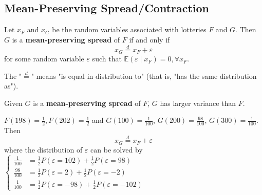 \documentclass[11pt]{elegantbook}
\begin{document}
\subsection{Mean-Preserving Spread/Contraction}
\begin{definition}
    \normalfont
    Let $x_F$ and $x_G$ be the random variables associated with lotteries $F$ and $G$. Then $G$ is a \textbf{mean-preserving spread} of $F$ if and only if $$x_G \stackrel{d}{=} x_F+\varepsilon$$
    for some random variable $\varepsilon$ such that $\mathbb{E}(\varepsilon\mid x_F)=0,\forall x_F$.
\end{definition}
The "$\stackrel{d}{=}$" means "is equal in distribution to" (that is, "has the same distribution as").

\begin{note}
    Given $G$ is a \textbf{mean-preserving spread} of $F$, $G$ has larger variance than $F$.
\end{note}

\begin{example}
    $F(198)=\frac{1}{2}, F(202)=\frac{1}{2}$ and $G(100)=\frac{1}{100}$, $G(200)=\frac{98}{100}$, $G(300)=\frac{1}{100}$. Then $$x_G \stackrel{d}{=} x_F+\varepsilon$$
    where the distribution of $\varepsilon$ can be solved by $\left\{\begin{matrix}
        \frac{1}{100}&=\frac{1}{2}P(\varepsilon=102)+\frac{1}{2}P(\varepsilon=98)\\
        \frac{98}{100}&=\frac{1}{2}P(\varepsilon=2)+\frac{1}{2}P(\varepsilon=-2)\\
        \frac{1}{100}&=\frac{1}{2}P(\varepsilon=-98)+\frac{1}{2}P(\varepsilon=-102)
    \end{matrix}\right.$
\end{example}
\end{document}
